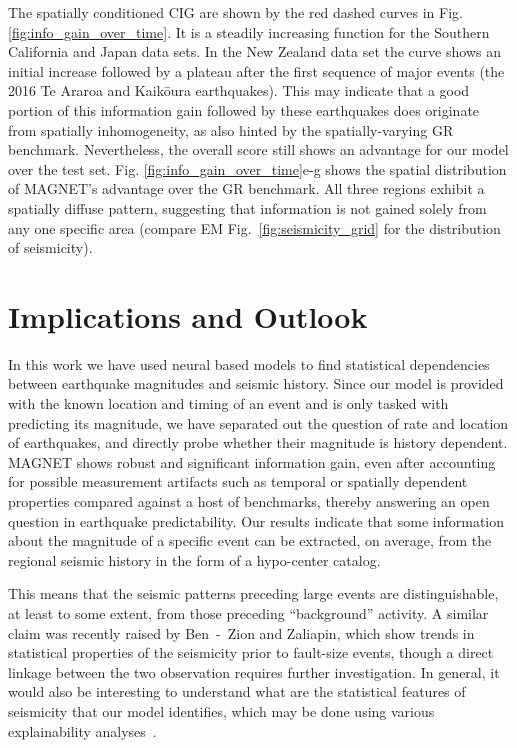 \documentclass[pdflatex]{sn-jnl}
\begin{document}
The spatially conditioned CIG are shown by the red dashed curves in Fig. \ref{fig:info_gain_over_time}. It is a steadily increasing function for the Southern California and Japan data sets. In the New Zealand data set the curve shows an initial increase followed by a plateau after the first sequence of major events (the 2016 Te Araroa and Kaikōura earthquakes). This may indicate that a good portion of this information gain followed by these earthquakes does originate from spatially inhomogeneity, as also hinted by the spatially-varying GR benchmark. Nevertheless, the overall score still shows an advantage for our model over the test set.
Fig. \ref{fig:info_gain_over_time}e-g shows the spatial distribution of MAGNET's advantage over the GR benchmark. All three regions exhibit a spatially diffuse pattern, suggesting that information is not gained solely from any one specific area (compare EM Fig.~\ref{fig:seismicity_grid} for the distribution of seismicity).

\section{Implications and Outlook}
In this work we have used neural based models to find statistical dependencies between earthquake magnitudes and seismic history. Since our model is provided with the known location and timing of an event and is only tasked with predicting its magnitude, we have separated out the question of rate and location of earthquakes, and directly probe whether their magnitude is history dependent. MAGNET shows robust and significant information gain, even after accounting for possible measurement artifacts such as temporal or spatially dependent properties compared against a host of benchmarks, thereby answering an open question in earthquake predictability. Our results indicate that some information about the magnitude of a specific event can be extracted, on average, from the regional seismic history in the form of a hypo-center catalog.

This means that the seismic patterns preceding large events are distinguishable, at least to some extent, from those preceding ``background'' activity. A similar claim was recently raised by Ben~-~Zion and Zaliapin\cite{ben-zion_localization_2020}, which show trends in statistical properties of the seismicity prior to fault-size events, though a direct linkage between the two observation requires further investigation. 
In general, it would also be interesting to understand what are the statistical features of seismicity that our model identifies, which may be done using various explainability analyses~\cite{sturmfels_visualizing_2020, zhang_survey_2021, liu_interpretable_2023}. 
\end{document}
